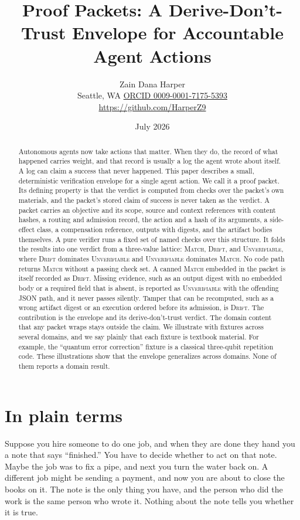 \documentclass[11pt]{article}
\title{\textbf{Proof Packets: A Derive-Don't-Trust Envelope for Accountable Agent Actions}}
\author{Zain Dana Harper\\[2pt]\small Seattle, WA \quad\textbar\quad \href{https://orcid.org/0009-0001-7175-5393}{ORCID 0009-0001-7175-5393}\\[2pt]\small\url{https://github.com/HarperZ9}}
\date{July 2026}
\begin{document}
\maketitle
\begin{abstract}
Autonomous agents now take actions that matter. When they do, the record of what happened carries weight, and that record is usually a log the agent wrote about itself. A log can claim a success that never happened. This paper describes a small, deterministic verification envelope for a single agent action. We call it a proof packet. Its defining property is that the verdict is computed from checks over the packet's own materials, and the packet's stored claim of success is never taken as the verdict. A packet carries an objective and its scope, source and context references with content hashes, a routing and admission record, the action and a hash of its arguments, a side-effect class, a compensation reference, outputs with digests, and the artifact bodies themselves. A pure verifier runs a fixed set of named checks over this structure. It folds the results into one verdict from a three-value lattice: \textsc{Match}, \textsc{Drift}, and \textsc{Unverifiable}, where \textsc{Drift} dominates \textsc{Unverifiable} and \textsc{Unverifiable} dominates \textsc{Match}. No code path returns \textsc{Match} without a passing check set. A canned \textsc{Match} embedded in the packet is itself recorded as \textsc{Drift}. Missing evidence, such as an output digest with no embedded body or a required field that is absent, is reported as \textsc{Unverifiable} with the offending JSON path, and it never passes silently. Tamper that can be recomputed, such as a wrong artifact digest or an execution ordered before its admission, is \textsc{Drift}. The contribution is the envelope and its derive-don't-trust verdict. The domain content that any packet wraps stays outside the claim. We illustrate with fixtures across several domains, and we say plainly that each fixture is textbook material. For example, the ``quantum error correction'' fixture is a classical three-qubit repetition code. These illustrations show that the envelope generalizes across domains. None of them reports a domain result.
\end{abstract}

\section*{In plain terms}
Suppose you hire someone to do one job, and when they are done they hand you a note that says ``finished.'' You have to decide whether to act on that note. Maybe the job was to fix a pipe, and next you turn the water back on. A different job might be sending a payment, and now you are about to close the books on it. The note is the only thing you have, and the person who did the work is the same person who wrote it. Nothing about the note tells you whether it is true.
\end{document}
